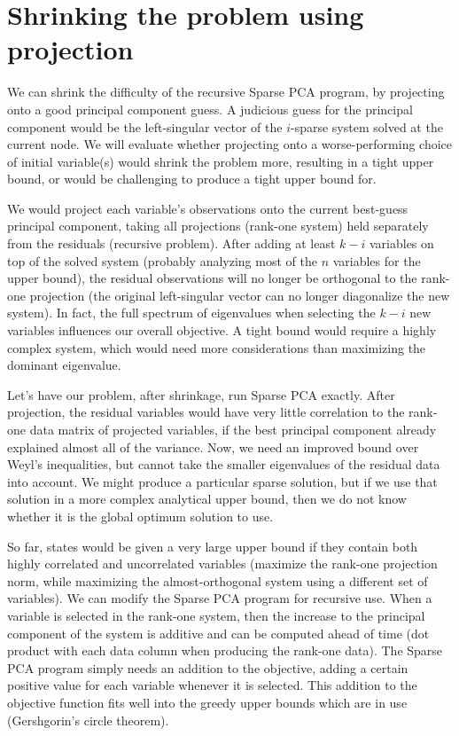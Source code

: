 \documentclass{article}
\begin{document}
\section{Shrinking the problem using projection}

We can shrink the difficulty of the recursive Sparse PCA program, by projecting onto a good principal component guess. A judicious guess for the principal component would be the left-singular vector of the $i$-sparse system solved at the current node. We will evaluate whether projecting onto a worse-performing choice of initial variable(s) would shrink the problem more, resulting in a tight upper bound, or would be challenging to produce a tight upper bound for.

We would project each variable's observations onto the current best-guess principal component, taking all projections (rank-one system) held separately from the residuals (recursive problem). After adding at least $k-i$ variables on top of the solved system (probably analyzing most of the $n$ variables for the upper bound), the residual observations will no longer be orthogonal to the rank-one projection (the original left-singular vector can no longer diagonalize the new system). In fact, the full spectrum of eigenvalues when selecting the $k-i$ new variables influences our overall objective. A tight bound would require a highly complex system, which would need more considerations than maximizing the dominant eigenvalue.

Let's have our problem, after shrinkage, run Sparse PCA exactly. After projection, the residual variables would have very little correlation to the rank-one data matrix of projected variables, if the best principal component already explained almost all of the variance. Now, we need an improved bound over Weyl's inequalities, but cannot take the smaller eigenvalues of the residual data into account. We might produce a particular sparse solution, but if we use that solution in a more complex analytical upper bound, then we do not know whether it is the global optimum solution to use.

So far, states would be given a very large upper bound if they contain both highly correlated and uncorrelated variables (maximize the rank-one projection norm, while maximizing the almost-orthogonal system using a different set of variables). We can modify the Sparse PCA program for recursive use. When a variable is selected in the rank-one system, then the increase to the principal component of the system is additive and can be computed ahead of time (dot product with each data column when producing the rank-one data). The Sparse PCA program simply needs an addition to the objective, adding a certain positive value for each variable whenever it is selected. This addition to the objective function fits well into the greedy upper bounds which are in use (Gershgorin's circle theorem).
\end{document}

